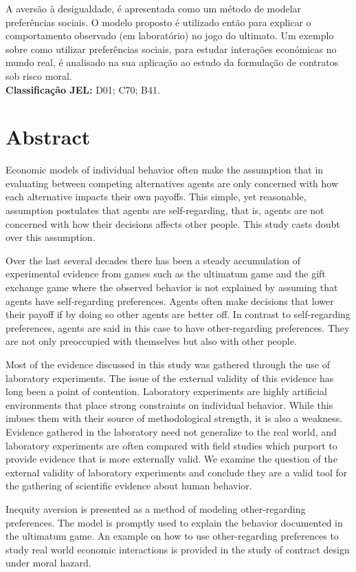 \documentclass[12pt]{article}
\begin{document}
A aversão à desigualdade, é apresentada como um método de modelar preferências sociais. O modelo proposto é utilizado então para explicar o comportamento observado (em laboratório) no jogo do ultimato. Um exemplo sobre como utilizar preferências sociais, para estudar interações económicas no mundo real, é analisado na sua aplicação ao estudo da formulação de contratos sob risco moral.
\\

\noindent
\textbf{Classificação JEL:} D01; C70; B41.

\newpage
\section*{Abstract}
Economic models of individual behavior often make the assumption that in evaluating between competing alternatives agents are only concerned with how each alternative impacts their own payoffs. This simple, yet reasonable, assumption postulates that agents are self-regarding, that is, agents are not concerned with how their decisions affects other people. This study casts doubt over this assumption. 

Over the last several decades there has been a steady accumulation of experimental evidence from games such as the ultimatum game and the gift exchange game where the observed behavior is not explained by assuming that agents have self-regarding preferences. Agents often make decisions that lower their payoff if by doing so other agents are better off. In contrast to self-regarding preferences, agents are said in this case to have other-regarding preferences. They are not only preoccupied with themselves but also with other people. 

Most of the evidence discussed in this study was gathered through the use of laboratory experiments. The issue of the external validity of this evidence has long been a point of contention. Laboratory experiments are highly artificial environments that place strong constraints on individual behavior. While this imbues them with their source of methodological strength, it is also a weakness. Evidence gathered in the laboratory need not generalize to the real world, and laboratory experiments are often compared with field studies which purport to provide evidence that is more externally valid. We examine the question of the external validity of laboratory experiments and conclude they are a valid tool for the gathering of scientific evidence about human behavior. 

Inequity aversion is presented as a method of modeling other-regarding preferences. The model is promptly used to explain the behavior documented in the ultimatum game. An example on how to use other-regarding preferences to study real world economic interactions is provided in the study of contract design under moral hazard.
\\
\end{document}
